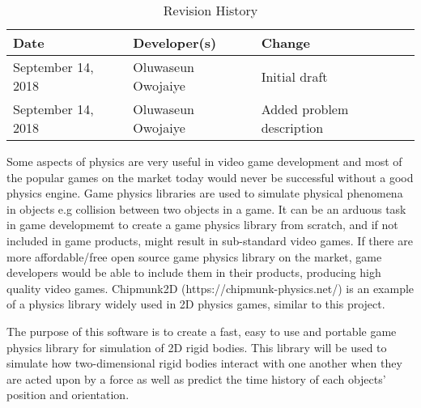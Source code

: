 \documentclass [12pt] {article}
\date{September 18, 2018}
\begin{document}
	\maketitle

\begin{table}[hp] \caption{Revision History} \label{TblRevisionHistory}
\begin{tabularx}{\textwidth}{llX} \toprule \textbf{Date} & \textbf{Developer(s)}
& \textbf{Change}\\ \midrule September 14, 2018 & Oluwaseun Owojaiye & Initial
draft\\ September 14, 2018 & Oluwaseun Owojaiye & Added problem description\\
\bottomrule \end{tabularx} \end{table}


Some aspects of physics are very useful in video game development and most of
the popular games on the market today would never be successful without a good
physics engine. Game physics libraries are used to simulate physical phenomena
in objects e.g collision between two objects in a game. It can be an arduous
task in game developmemt to create a game physics library from scratch, and if
not included in game products, might result in sub-standard video games. If
there are more affordable/free open source game physics library on the market,
game developers would be able to include them in their products, producing high
quality video games. Chipmunk2D (https://chipmunk-physics.net/) is an example of
a physics library widely used in 2D physics games, similar to this project.

The purpose of this software is to create a fast, easy to use and portable game
physics library for simulation of 2D rigid bodies. This library will be used to
simulate how two-dimensional rigid bodies interact with one another when they
are acted upon by a force as well as predict the time history of each objects'
position and orientation.




	
\end{document}
